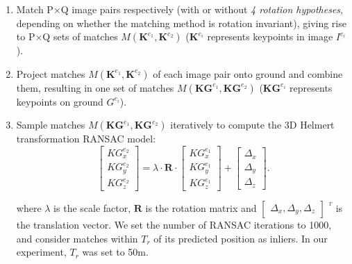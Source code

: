 \begin{enumerate}
    \item Match P$\times$Q image pairs respectively (with or without \textit{4 rotation hypotheses}, depending on whether the matching method is rotation invariant), giving rise to P$\times$Q sets of matches $M({\mathbf{K}^{e_1},\mathbf{K}^{e_2}})$ ($\mathbf{K}^{e_i}$ represents keypoints in image $I^{e_i}$).
    \item Project matches $M({\mathbf{K}^{e_1},\mathbf{K}^{e_2}})$ of each image pair onto ground and combine them, resulting in one set of matches $M({\mathbf{KG}^{e_1},\mathbf{KG}^{e_2}})$ ($\mathbf{KG}^{e_i}$ represents keypoints on ground $G^{e_i}$).
    \item Sample matches $M({\mathbf{KG}^{e_1},\mathbf{KG}^{e_2}})$ iteratively to compute the 3D Helmert transformation RANSAC model:
\begin{equation}
\left [ \begin{array}{c}
{KG}_x^{e_2}\\
{KG}_y^{e_2}\\
{KG}_z^{e_2}
\end{array}
\right ] =\lambda \cdot \mathbf{R} \cdot {\left [ \begin{array}{c}
    {KG}_x^{e_1}\\
    {KG}_y^{e_1}\\
    {KG}_z^{e_1}
    \end{array}
    \right ]} + \left [ \begin{array}{c}
\Delta_x\\
\Delta_y\\
\Delta_z
\end{array}
\right ]. \label{eq:2DSim}
\end{equation}
    
where $\lambda$ is the scale factor, $\mathbf{R}$ is the rotation matrix and $\left [ \begin{array}{c}
    \Delta_x, \Delta_y, \Delta_z
\end{array}
\right ]$ $^{^T}$ is the translation vector.
We set the number of RANSAC iterations to 1000, and consider matches within $T_r$ of its predicted position as inliers. In our experiment, {$T_r$ was set to 50m.}
\end{enumerate}

